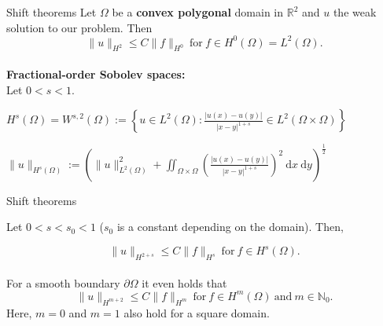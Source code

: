 \documentclass{beamer}
\begin{document}
\begin{frame}{Shift theorems}
Let $\Omega$ be a \textbf{convex polygonal} domain in $\mathbb{R}^2$ and $u$ the weak solution to our problem. \pause Then 
\begin{equation*}
	\| u \|_{H^2} \leq C \| f \|_{H^0} \ \text{for} \ f \in H^0(\Omega) = L^2(\Omega).
\end{equation*}\\[1ex]
\pause
\textbf{Fractional-order Sobolev spaces:}\\[0.1cm]
Let $0<s<1$.\\[0.2cm]
\pause

	$\displaystyle H^s(\Omega) = W^{s,2}(\Omega) := \left\{ u \in L^2(\Omega): \frac{|u(x)-u(y)|}{|x-y|^{1+s}} \in  L^2(\Omega \times \Omega) \right\}$

	$\displaystyle\|u\|_{H^s(\Omega)} := \left( \|u\|_{L^2(\Omega)}^2 + \iint_{\Omega \times \Omega} \left( \frac{|u(x)-u(y)|}{|x-y|^{1+s}} \right)^2 \ \text{d}x \ \text{d}y \right)^\frac{1}{2}$

\end{frame}


\begin{frame}{Shift theorems}

Let $0 < s < s_0 < 1$ ($s_0$ is a constant depending on the domain). Then,\vspace{-0.2cm}

\begin{equation*}
	\|u\|_{H^{2+s}} \leq C \|f\|_{H^s} \ \text{for} \ f \in H^s(\Omega).
\end{equation*}\\[0.5cm]

\pause
For a smooth boundary $\partial \Omega$ it even holds that \begin{equation*}
	\|u\|_{H^{m+2}} \leq C \|f\|_{H^m} \ \text{for} \ f \in  H^m(\Omega) \ \text{and} \ m \in \mathbb{N}_0.
\end{equation*}
\pause
Here, $m=0$ and $m=1$ also hold for a square domain.
%


\end{frame}
\end{document}

